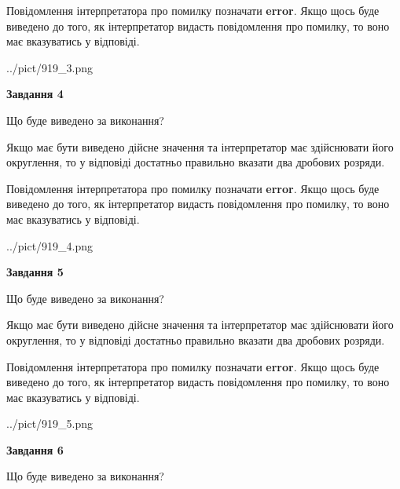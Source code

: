 \documentclass[12pt, ukrainian]{article}
\begin{document}
{\begin {Large}
Повідомлення інтерпретатора про помилку позначати \textbf{error}.
Якщо щось буде виведено до того, як інтерпретатор видасть повідомлення про помилку, 
то воно має вказуватись у відповіді. \par

\begin{center}
	{../pict/919_3.png}
\end{center}
\newpage

{\begin {center}\textbf{Завдання 4}\end {center}}\par
Що буде виведено за виконання? \par

Якщо має бути виведено дійсне значення та інтерпретатор має здійснювати його округлення, 
то у відповіді достатньо правильно вказати два дробових розряди.

Повідомлення інтерпретатора про помилку позначати \textbf{error}.
Якщо щось буде виведено до того, як інтерпретатор видасть повідомлення про помилку, 
то воно має вказуватись у відповіді. \par

\begin{center}
	{../pict/919_4.png}
\end{center}
\newpage

{\begin {center}\textbf{Завдання 5}\end {center}}\par
Що буде виведено за виконання? \par

Якщо має бути виведено дійсне значення та інтерпретатор має здійснювати його округлення, 
то у відповіді достатньо правильно вказати два дробових розряди.

Повідомлення інтерпретатора про помилку позначати \textbf{error}.
Якщо щось буде виведено до того, як інтерпретатор видасть повідомлення про помилку, 
то воно має вказуватись у відповіді. \par

\begin{center}
	{../pict/919_5.png}
\end{center}
\newpage

{\begin {center}\textbf{Завдання 6}\end {center}}\par
Що буде виведено за виконання? \par


\end{Large}}
\end{document}
